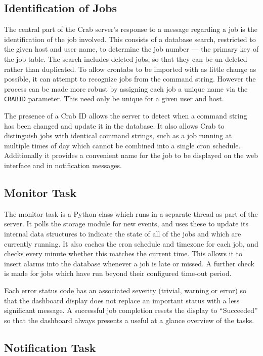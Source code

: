 \subsection{Identification of Jobs}

The central part of the Crab server's response to a message regarding a job is the identification of the job involved. This consists of a database search, restricted to the given host and user name, to determine the job number --- the primary key of the job table. The search includes deleted jobs, so that they can be un-deleted rather than duplicated. To allow crontabs to be imported with as little change as possible, it can attempt to recognize jobs from the command string. However the process can be made more robust by assigning each job a unique name via the \texttt{CRABID} parameter. This need only be unique for a given user and host.

The presence of a Crab ID allows the server to detect when a command string has been changed and update it in the database. It also allows Crab to distinguish jobs with identical command strings, such as a job running at multiple times of day which cannot be combined into a single cron schedule. Additionally it provides a convenient name for the job to be displayed on the web interface and in notification messages.

\subsection{Monitor Task}

The monitor task is a Python class which runs in a separate thread as part of the server. It polls the storage module for new events, and uses these to update its internal data structures to indicate the state of all of the jobs and which are currently running. It also caches the cron schedule and timezone for each job, and checks every minute whether this matches the current time. This allows it to insert alarms into the database whenever a job is late or missed. A further check is made for jobs which have run beyond their configured time-out period.

Each error status code has an associated severity (trivial, warning or error) so that the dashboard display does not replace an important status with a less significant message. A successful job completion resets the display to ``Succeeded'' so that the dashboard always presents a useful at a glance overview of the tasks.

\subsection{Notification Task}

